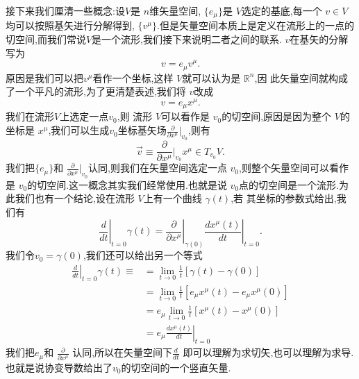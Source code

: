\documentclass[../main.tex]{subfiles}
\begin{document}
接下来我们厘清一些概念:设$V$是 $n$维矢量空间, $\{e_\mu\}$是 $V$选定的基底,每一个 $v \in V$均可以按照基矢进行分解得到, $\{v^\mu\}$.但是矢量空间本质上是定义在流形上的一点的切空间,而我们常说$V$是一个流形,我们接下来说明二者之间的联系. $v$在基矢的分解写为
 \[
v = e_\mu v^\mu
.\] 
原因是我们可以把$v^\mu$看作一个坐标,这样 $V$就可以认为是 $\mathbb{R}^n$,因 此矢量空间就构成了一个平凡的流形,为了更清楚表述,我们将 $v$改成 \[
v = e_\mu x^\mu
.\] 
我们在流形$V$上选定一点$v_0$,则 流形 $V$可以看作是 $v_0$的切空间,原因是因为整个 $V$的坐标是 $x^\mu$,我们可以生成$v_0$坐标基矢场$\frac{\partial   }{\partial x^\mu}|_{v_0} $,则有\[
  \vec{v} \equiv \frac{\partial   }{\partial x^\mu}|_{v_0} x^\mu \in T_{v_0}V 
.\] 
我们把$\{e_\mu\}$和 $\frac{\partial   }{\partial x^\mu}|_{v_0}$认同,则我们在矢量空间选定一点 $v_0$,则整个矢量空间可以看作是 $v_0$的切空间.这一概念其实我们经常使用.也就是说 $v_0$点的切空间是一个流形.为此我们也有一个结论,设在流形 $V$上有一个曲线 $\gamma(t)$,若
其坐标的参数式给出,我们有 \[
\left.\frac{d}{dt}\right|_{t = 0} \gamma(t) = \left.\frac{\partial}{\partial x^\mu}\right|_{\gamma(0)} \left.\frac{d x^\mu(t)}{dt}\right|_{t = 0}  
.\] 
我们令$v_0 = \gamma(0)$,我们还可以给出另一个等式 
\begin{align*}
  \left.\frac{d}{dt}\right|_{t = 0} \gamma(t) \equiv& = \lim_{t\to 0} \frac{1}{t} [\gamma(t) - \gamma(0)]\\
                                                    & = \lim_{t\to  0}\frac{1}{t}[e_\mu x^\mu(t) - e_\mu x^\mu(0)] \\
                                                    & = e_\mu \lim_{t\to 0} \frac{1}{t} [x^\mu(t) - x^\mu(0)] \\
                                                    & = e_\mu \left.\frac{d x^\mu(t)}{dt}\right|_{t = 0} 
  \end{align*} 
  我们把$e_\mu$和 $\frac{\partial   }{\partial x^\mu} $ 认同,所以在矢量空间下$\frac{d}{dt} $ 即可以理解为求切矢,也可以理解为求导.也就是说协变导数给出了$v_0$的切空间的一个竖直矢量.
\end{document}
